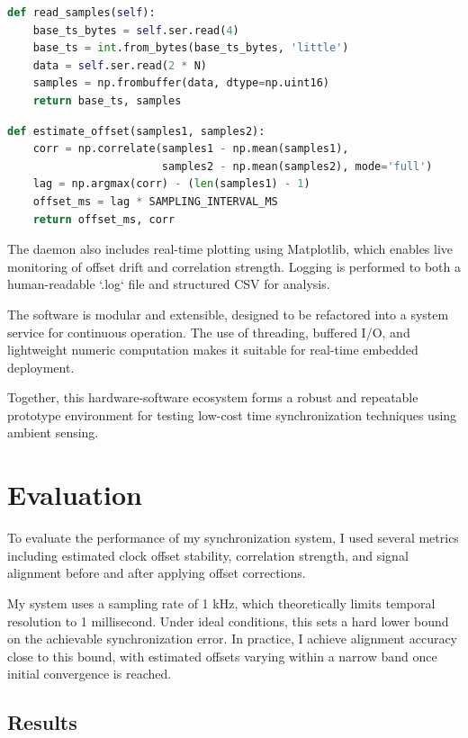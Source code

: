 \documentclass[sigconf]{acmart}
\begin{document}
\begin{lstlisting}[language=Python,caption=Serial reader snippet]
def read_samples(self):
    base_ts_bytes = self.ser.read(4)
    base_ts = int.from_bytes(base_ts_bytes, 'little')
    data = self.ser.read(2 * N)
    samples = np.frombuffer(data, dtype=np.uint16)
    return base_ts, samples
\end{lstlisting}

\begin{lstlisting}[language=Python,caption=Cross-correlation for offset estimation]
def estimate_offset(samples1, samples2):
    corr = np.correlate(samples1 - np.mean(samples1),
                        samples2 - np.mean(samples2), mode='full')
    lag = np.argmax(corr) - (len(samples1) - 1)
    offset_ms = lag * SAMPLING_INTERVAL_MS
    return offset_ms, corr
\end{lstlisting}

The daemon also includes real-time plotting using Matplotlib, which enables live monitoring of offset drift and correlation strength. Logging is performed to both a human-readable `.log` file and structured CSV for analysis.

The software is modular and extensible, designed to be refactored into a system service for continuous operation. The use of threading, buffered I/O, and lightweight numeric computation makes it suitable for real-time embedded deployment.

Together, this hardware-software ecosystem forms a robust and repeatable prototype environment for testing low-cost time synchronization techniques using ambient sensing.

\section{Evaluation}

To evaluate the performance of my synchronization system, I used several metrics including estimated clock offset stability, correlation strength, and signal alignment before and after applying offset corrections.

My system uses a sampling rate of 1 kHz, which theoretically limits temporal resolution to 1 millisecond. Under ideal conditions, this sets a hard lower bound on the achievable synchronization error. In practice, I achieve alignment accuracy close to this bound, with estimated offsets varying within a narrow band once initial convergence is reached.

\subsection{Results}
\end{document}
